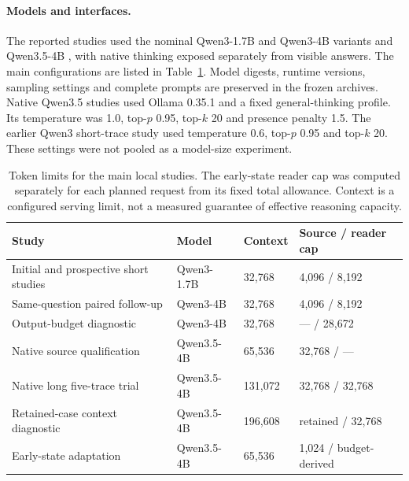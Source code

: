 \paragraph{Models and interfaces.} The reported studies used the nominal Qwen3-1.7B and Qwen3-4B variants \citep{yang2025qwen3} and Qwen3.5-4B \citep{qwen2026qwen35card}, with native thinking exposed separately from visible answers. The main configurations are listed in Table~\ref{tab:local-configurations}. Model digests, runtime versions, sampling settings and complete prompts are preserved in the frozen archives. Native Qwen3.5 studies used Ollama 0.35.1 and a fixed general-thinking profile. Its temperature was 1.0, top-$p$ 0.95, top-$k$ 20 and presence penalty 1.5. The earlier Qwen3 short-trace study used temperature 0.6, top-$p$ 0.95 and top-$k$ 20. These settings were not pooled as a model-size experiment.

\begin{table}[htbp]
\centering\small
\begin{tabular}{>{\raggedright\arraybackslash}p{.33\linewidth}lll}
\toprule
Study & Model & Context & Source / reader cap\\
\midrule
Initial and prospective short studies & Qwen3-1.7B & 32,768 & 4,096 / 8,192\\
Same-question paired follow-up & Qwen3-4B & 32,768 & 4,096 / 8,192\\
Output-budget diagnostic & Qwen3-4B & 32,768 & --- / 28,672\\
Native source qualification & Qwen3.5-4B & 65,536 & 32,768 / ---\\
Native long five-trace trial & Qwen3.5-4B & 131,072 & 32,768 / 32,768\\
Retained-case context diagnostic & Qwen3.5-4B & 196,608 & retained / 32,768\\
Early-state adaptation & Qwen3.5-4B & 65,536 & 1,024 / budget-derived\\
\bottomrule
\end{tabular}
\caption{Token limits for the main local studies. The early-state reader cap was computed separately for each planned request from its fixed total allowance. Context is a configured serving limit, not a measured guarantee of effective reasoning capacity.}
\label{tab:local-configurations}
\end{table}

